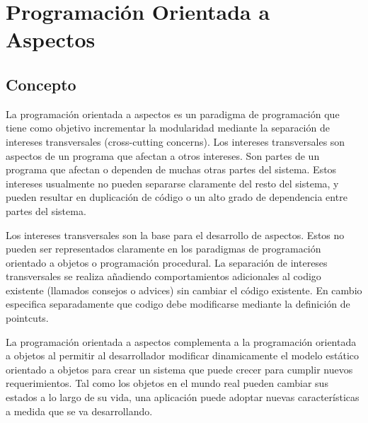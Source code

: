 \section{Programación Orientada a Aspectos}


\subsection{Concepto}

La programación orientada a aspectos es un paradigma de programación que tiene
como objetivo incrementar la modularidad mediante la separación de intereses
transversales (cross-cutting concerns). 
Los intereses transversales son aspectos de un programa que afectan a otros
intereses. Son partes de un programa que afectan o dependen de muchas
otras partes del sistema.
Estos intereses usualmente no pueden separarse claramente del resto del
sistema, y pueden resultar en duplicación de código o un alto grado de
dependencia entre partes del sistema.


Los intereses transversales son la base para el desarrollo de aspectos. Estos no
pueden ser representados claramente en los paradigmas de programación orientado
a objetos o programación procedural.
La separación de intereses transversales se realiza añadiendo comportamientos
adicionales al codigo existente (llamados consejos o advices) sin cambiar el
código existente. En cambio especifica separadamente que codigo debe modificarse
mediante la definición de pointcuts. 

La programación orientada a aspectos complementa a la programación orientada a
objetos al permitir al desarrollador modificar dinamicamente el modelo estático
orientado a objetos para crear un sistema que puede crecer para cumplir nuevos
requerimientos. Tal como los objetos en el mundo real pueden cambiar sus estados
a lo largo de su vida, una aplicación puede adoptar nuevas características a
medida que se va desarrollando. \cite{Introduction_To_Aspect}


